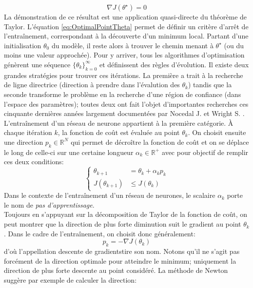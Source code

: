 \begin{equation}
	\label{eq:OptimalPointTheta}
	\nabla J(\theta^\star) = 0
\end{equation}
La démonstration de ce résultat est une application quasi-directe du théorème de Taylor. L'équation \ref{eq:OptimalPointTheta} permet de définir un critère d'arrêt de l'entraînement, correspondant à la découverte d'un minimum local. Partant d'une initialisation $\theta_0$ du modèle, il reste alors à trouver le chemin menant à $\theta^\star$ (ou du moins une valeur approchée). Pour y arriver, tous les algorithmes d'optimisation génèrent une séquence $\{\theta_k\}_{k=0}^{\infty}$ et définissent des règles d'évolution. Il existe deux grandes stratégies pour trouver ces itérations. La première a trait à la recherche de ligne directrice (direction à prendre dans l'évalution des $\theta_k$) tandis que la seconde transforme le problème en la recherche d'une région de confiance (dans l'espace des paramètres); toutes deux ont fait l'objet d'importantes recherches ces cinquante dernières années largement documentées par Nocedal J. et Wright S. \cite{nocedalIntroduction2006}. 
\\
L'entraînement d'un réseau de neurone appartient à la première catégorie. À chaque itération $k$, la fonction de coût est évaluée au point $\theta_k$. On choisit ensuite une direction $p_k \in \mathbb{R}^N$ qui permet de décroître la fonction de coût et on se déplace le long de celle-ci sur une certaine longueur $\alpha_k \in \mathbb{R}^+$ avec pour objectif de remplir ces deux conditions:
\begin{equation}
	 \left\{ \begin{array}{cl}
		\theta_{k+1} &= \theta_k + \alpha_k p_k \\
		J(\theta_{k+1}) &\leq J(\theta_{k})
	\end{array} \right.
\end{equation}
Dans le contexte de l'entraînement d'un réseau de neurones, le scalaire $\alpha_k$ porte le nom de \textit{pas d'apprentissage}. 
\\
Toujours en s'appuyant sur la décomposition de Taylor de la fonction de coût, on peut montrer que la direction de plus forte diminution suit le gradient au point $\theta_{k}$. Dans le cadre de l'entraînement, on choisit donc généralement:
\begin{equation}
	p_k = -\nabla J(\theta_k)
\end{equation}
d'où l'appellation \og descente de gradients\fg tire son nom. Notons qu'il ne s'agit pas forcément de la direction optimale pour atteindre le minimum; uniquement la direction de plus forte descente au point considéré. La méthode de Newton suggère par exemple de calculer la direction:
